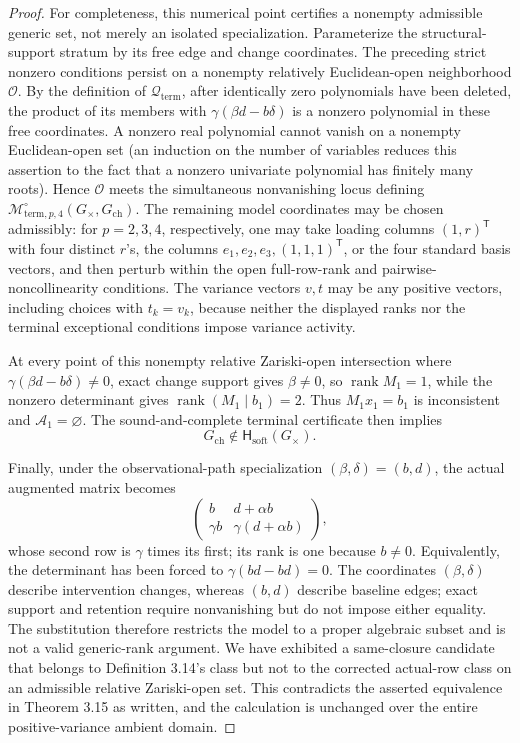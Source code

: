 \documentclass{article}
\begin{document}
\begin{proof}
For completeness, this numerical point certifies a nonempty admissible generic set, not merely an isolated specialization.  Parameterize the structural-support stratum by its free edge and change coordinates.  The preceding strict nonzero conditions persist on a nonempty relatively Euclidean-open neighborhood \(\mathcal O\).  By the definition of \(\mathcal Q_{\mathrm{term}}\), after identically zero polynomials have been deleted, the product of its members with \(\gamma(\beta d-b\delta)\) is a nonzero polynomial in these free coordinates.  A nonzero real polynomial cannot vanish on a nonempty Euclidean-open set (an induction on the number of variables reduces this assertion to the fact that a nonzero univariate polynomial has finitely many roots).  Hence \(\mathcal O\) meets the simultaneous nonvanishing locus defining \(\mathcal M^{\circ}_{\mathrm{term},p,4}(G_{\times},G_{\mathrm{ch}})\).  The remaining model coordinates may be chosen admissibly: for \(p=2,3,4\), respectively, one may take loading columns \((1,r)^{\mathsf T}\) with four distinct \(r\)'s, the columns \(e_1,e_2,e_3,(1,1,1)^{\mathsf T}\), or the four standard basis vectors, and then perturb within the open full-row-rank and pairwise-noncollinearity conditions.  The variance vectors \(v,t\) may be any positive vectors, including choices with \(t_k=v_k\), because neither the displayed ranks nor the terminal exceptional conditions impose variance activity.

At every point of this nonempty relative Zariski-open intersection where \(\gamma(\beta d-b\delta)\ne0\), exact change support gives \(\beta\ne0\), so \(\operatorname{rank}M_1=1\), while the nonzero determinant gives \(\operatorname{rank}(M_1\mid b_1)=2\).  Thus \(M_1x_1=b_1\) is inconsistent and \(\mathcal A_1=\varnothing\).  The sound-and-complete terminal certificate then implies
\[
G_{\mathrm{ch}}\notin\mathsf H_{\mathrm{soft}}(G_{\times}).
\]

Finally, under the observational-path specialization \((\beta,\delta)=(b,d)\), the actual augmented matrix becomes
\[
\begin{pmatrix}
b&d+\alpha b\\
\gamma b&\gamma(d+\alpha b)
\end{pmatrix},
\]
whose second row is \(\gamma\) times its first; its rank is one because \(b\ne0\).  Equivalently, the determinant has been forced to \(\gamma(bd-bd)=0\).  The coordinates \((\beta,\delta)\) describe intervention changes, whereas \((b,d)\) describe baseline edges; exact support and retention require nonvanishing but do not impose either equality.  The substitution therefore restricts the model to a proper algebraic subset and is not a valid generic-rank argument.  We have exhibited a same-closure candidate that belongs to Definition 3.14's class but not to the corrected actual-row class on an admissible relative Zariski-open set.  This contradicts the asserted equivalence in Theorem 3.15 as written, and the calculation is unchanged over the entire positive-variance ambient domain.
\end{proof}
\end{document}
